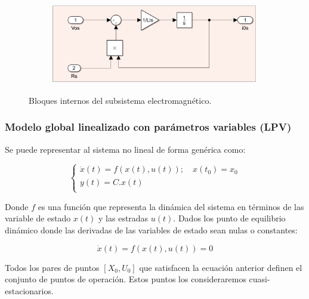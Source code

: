 \documentclass{article}
\begin{document}
\begin{figure}[H]
    \centering
    \begin{subfigure}[b]{0.75\textwidth}
        \centering
        \includegraphics[width=1\textwidth]{sub_electromagentico2.png}
    \end{subfigure}
    \caption{Bloques internos del subsistema electromagnético.}
\end{figure}


\subsubsection{Modelo global linealizado con parámetros variables (LPV)}

Se puede representar al sistema no lineal de forma genérica
como: 

\begin{equation}
    \begin{cases}
        \dot{x}(t) = f(x(t),u(t));  \quad   x(t_{0}) = x_{0}\\
        y(t) = C.x(t)\\
    \end{cases}
\end{equation}

Donde $f$ es una función que representa la dinámica del sistema en términos de las variable 
de estado $x(t)$ y las estradas $u(t)$.  
Dados los punto de equilibrio dinámico donde las derivadas de las variables de estado sean nulas o constantes:

\begin{equation}
    \dot{x}(t) = f(x(t),u(t)) = 0
\end{equation}

Todos los pares de puntos $[X_0,U_0]$ que satisfacen la ecuación anterior definen el conjunto de
puntos de operación. Estos puntos los consideraremos cuasi-estacionarios. 
\end{document}
